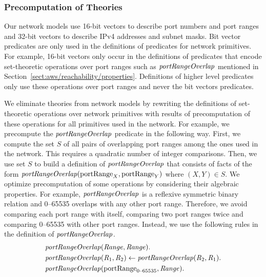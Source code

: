 
\subsubsection*{Precomputation of Theories}
Our network models use 16-bit vectors to describe port numbers and port ranges and 32-bit vectors to describe IPv4 addresses and subnet masks. Bit vector predicates are only used in the definitions of predicates for network primitives. For example, 16-bit vectors only occur in the definitions of predicates that encode set-theoretic operations over port ranges such as $\mathit{portRangeOverlap}$ mentioned in Section~\ref{sect:aws/reachability/properties}. Definitions of higher level predicates only use these operations over port ranges and never the bit vectors predicates.

We eliminate theories from network models by rewriting the definitions of set-theoretic operations over network primitives with results of precomputation of these operations for all primitives used in the network. For example, we precompute the $\mathit{portRangeOverlap}$ predicate in the following way. First, we compute the set $S$ of all pairs of overlapping port ranges among the ones used in the network. This requires a quadratic number of integer comparisons. Then, we use set $S$ to build a definition of $\mathit{portRangeOverlap}$ that consists of facts of the form $\mathit{portRangeOverlap}(\mathrm{portRange}_X,\mathrm{portRange}_Y)$ where $(X,Y)\in S$. We optimize precomputation of some operations by considering their algebraic properties. For example, $\mathit{portRangeOverlap}$ is a reflexive symmetric binary relation and 0--65535 overlaps with any other port range. Therefore, we avoid comparing each port range with itself, comparing two port ranges twice and comparing 0--65535 with other port ranges. Instead, we use the following rules in the definition of $\mathit{portRangeOverlap}$.
\begin{equation}\label{eq:aws/port-range-algebraic}
\begin{aligned}
&\mathit{portRangeOverlap}(\mathit{Range},\mathit{Range}).\\
&\mathit{portRangeOverlap}(\mathit{R}_1,\mathit{R}_2)\leftarrow\mathit{portRangeOverlap}(\mathit{R}_2,\mathit{R}_1).\\
&\mathit{portRangeOverlap}(\mathrm{portRange}_\text{0--65535},\mathit{Range}).
\end{aligned}
\end{equation}


